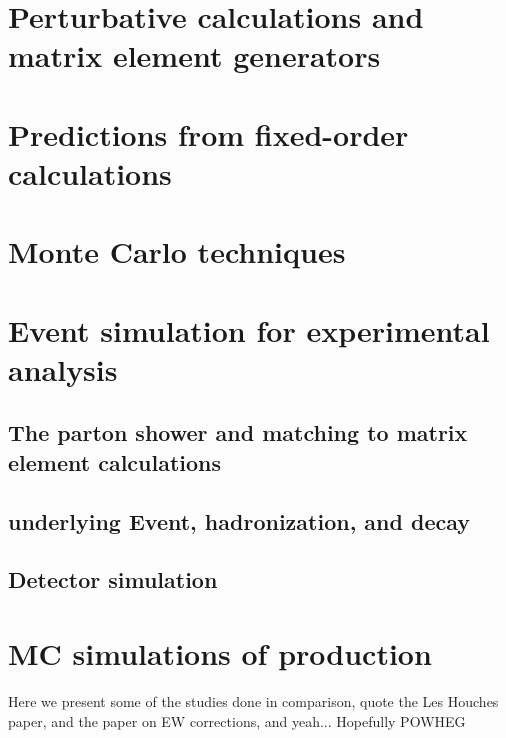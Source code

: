 \section{Perturbative calculations and matrix element generators}
\section{Predictions from fixed-order calculations}
\section{Monte Carlo techniques}
\section{Event simulation for experimental analysis}
  \subsection{The parton shower and matching to matrix element calculations}
  \subsection{underlying Event, hadronization, and decay}
  \subsection{Detector simulation}
\section{MC simulations of \WZjj production}

Here we present some of the studies done in comparison, quote the Les Houches paper,
and the paper on EW corrections, and yeah... Hopefully POWHEG
